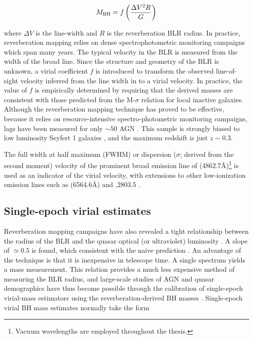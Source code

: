 \begin{equation}
M_{\rm BH} = f\left( \frac{\Delta V^2R}{G} \right)
\end{equation}

where $\Delta V$ is the line-width and $R$ is the reverberation BLR radius.  
In practice, reverberation mapping relies on dense spectrophotometric monitoring campaigns which span many years. 
The typical velocity in the BLR is measured from the width of the broad \hb line.
Since the structure and geometry of the BLR is unknown, a virial coefficient $f$ is introduced to transform the observed line-of-sight velocity inferred from the line width in to a virial velocity. 
In practice, the value of $f$ is empirically determined by requiring that the derived masses are consistent with those predicted from the M-$\sigma$  relation for local inactive galaxies. 
Although the reverberation mapping technique has proved to be effective, because it relies on resource-intensive spectro-photometric monitoring campaigns, lags have been measured for only $\sim50$ AGN \citep[e.g.][]{kaspi00,peterson04,kaspi07,bentz09,denney10,barth11,grier12}. 
This sample is strongly biased to low luminosity Seyfert 1 galaxies , and the maximum redshift is just $z\sim0.3$. 

The full width at half maximum (FWHM) or dispersion ($\sigma$; derived from the second moment) velocity of the prominent broad emission line of \hb (4862.7\AA)\footnote{Vacuum wavelengths are employed throughout the thesis.} 
is used as an indicator of the virial velocity, with extensions to other low-ionization emission lines such as \ha (6564.6\AA) and ,2803.5 \citep[e.g.][]{vestergaard02,mclure02,wu04,kollmeier06,onken08,wang09,rafiee11}.
 

\subsection{Single-epoch virial estimates}

Reverberation mapping campaigns have also revealed a tight relationship between the radius of the BLR and the quasar optical (or ultraviolet) luminosity \citep[the $R-L$ relation; e.g.][]{kaspi00,kaspi07}.
A slope of $\simeq0.5$ is found, which consistent with the naive prediction \citep[e.g.][]{peterson97}. 
An advantage of the technique is that it is inexpensive in telescope time. 
A single spectrum yields a mass measurement. 
This relation provides a much less expensive method of measuring the BLR radius, and large-scale studies of AGN and quasar demographics have thus become possible through the calibration of single-epoch virial-mass estimators using the reverberation-derived BH masses \citep[e.g.][]{greene05b,vestergaard06,vestergaard09,shen11,shen12,trakhtenbrot12}.
Single-epoch virial BH mass estimates normally take the form

